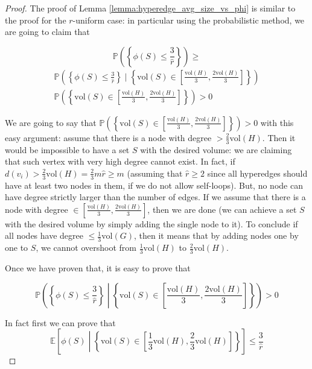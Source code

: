 \documentclass[../main.tex]{subfiles}
\begin{document}
\begin{proof}
    The proof of Lemma \ref{lemma:hyperedge_avg_size_vs_phi} is similar to the proof for the $r$-uniform case: in particular using the probabilistic method, we are going to claim that
    
    \begin{equation}
        \mathbb{P}\left(\left\{\phi(S) \leq \frac{3}{\hat{r}}\right\}\right) \geq
    \end{equation}
    \begin{multline}
        \mathbb{P}\left(\left\{\phi(S) \leq \frac{3}{\hat{r}}\right\} \mid \left\{\text{vol}(S) \in \left[\frac{\text{vol}(H)}{3}, \frac{2\text{vol}(H)}{3}\right]\right\}\right) \\ \mathbb{P}\left(\left\{\text{vol}(S)\in\left[\frac{\text{vol}(H)}{3}, \frac{2\text{vol}(H)}{3}\right]\right\}\right)  >  0
    \end{multline}
    
    We are going to say that $\mathbb{P}\left(\left\{\text{vol}(S)\in\left[\frac{\text{vol}(H)}{3}, \frac{2\text{vol}(H)}{3}\right]\right\}\right) > 0$ with this easy argument: assume that there is a node with degree $> \frac{2}{3}\text{vol}(H)$. Then it would be impossible to have a set $S$ with the desired volume: we are claiming that such vertex with very high degree cannot exist. In fact, if $d(v_i) > \frac{2}{3}\text{vol}(H) = \frac{2}{3}m\hat{r} \geq m$ (assuming that $\hat{r}\geq 2$ since all hyperedges should have at least two nodes in them, if we do not allow self-loops). But, no node can have degree strictly larger than the number of edges. If we assume that there is a node with degree $\in\left[\frac{\text{vol}(H)}{3}, \frac{2\text{vol}(H)}{3}\right]$, then we are done (we can achieve a set $S$ with the desired volume by simply adding the single node to it). To conclude if all nodes have degree $\leq \frac{1}{3}\text{vol}(G)$, then it means that by adding nodes one by one to $S$, we cannot overshoot from $\frac{1}{3}\text{vol}(H)$ to $\frac{2}{3}\text{vol}(H)$.
    
    Once we have proven that, it is easy to prove that
    
    \begin{equation}
        \mathbb{P}\left(\left\{\phi(S)\leq \frac{3}{\hat{r}}\right\} \middle| \left\{\text{vol}(S)\in\left[\frac{\text{vol}(H)}{3}, \frac{2\text{vol}(H)}{3}\right]\right\}\right) > 0
    \end{equation}
    
    In fact first we can prove that 
    \begin{equation}
        \mathbb{E}\left[\phi(S) \middle|     \left\{\text{vol}(S)\in\left[\frac{1}{3}\text{vol}(H), \frac{2}{3}\text{vol}(H)\right]\right\}\right] \leq \frac{3}{\hat{r}} 
    \end{equation}
    

\end{proof}
\end{document}
